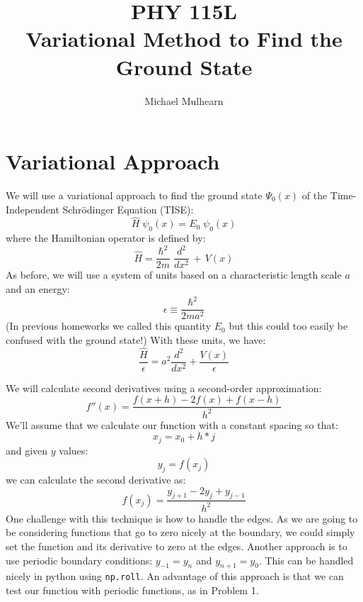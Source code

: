 \documentclass[12pt]{book}
\begin{document}
\newcommand{\ihbar}{\ensuremath{i \hbar}}
\newcommand{\Pss}{\ensuremath{\Psi^*}}
\newcommand{\dPsidt}{\ensuremath{ \frac{\partial \Psi}{\partial t} }}
\newcommand{\dPsidx}{\ensuremath{ \frac{\partial \Psi}{\partial x} }}
\newcommand{\ddPsidx}{\ensuremath{ \frac{\partial^2 \Psi}{\partial x^2} }}
\newcommand{\dPssdt}{\ensuremath{ \frac{\partial \Psi^*}{\partial t} }}
\newcommand{\dPssdx}{\ensuremath{ \frac{\partial \Psi^*}{\partial x} }}
\newcommand{\ddPssdx}{\ensuremath{ \frac{\partial^2 \Psi^*}{\partial x^2} }}

\newcommand{\dphidt}{\ensuremath{ \frac{d \phi}{dt} }}
\newcommand{\dpsidx}{\ensuremath{ \frac{d \psi}{dx} }}
\newcommand{\ddpsidx}{\ensuremath{ \frac{d^2 \psi}{dx^2} }}


\title{PHY 115L \\ Variational Method to Find the Ground State }
\author{Michael Mulhearn}

\maketitle

\setcounter{chapter}{0}
\chapter{Variational Approach}

We will use a variational approach to find the ground state $\Psi_0(x)$ of the Time-Independent Schr\"odinger Equation (TISE):
$$\hat{H} \; \psi_0(x) = E_0 \; \psi_0(x)$$
where the Hamiltonian operator is defined by:
\begin{equation}
\hat{H} = \frac{\hbar^2}{2 m} \; \frac{d^2}{dx^2} \, + \, V(x)
\end{equation}
As before, we will use a system of units based on a characteristic length scale $a$ and an energy:
\begin{equation}
\epsilon \equiv \frac{\hbar^2}{2ma^2}
\end{equation}
(In previous homeworks we called this quantity $E_0$ but this could too easily be confused with the ground state!)  With these units, we have:
\begin{equation}
\frac{\hat{H}}{\epsilon} = a^2\frac{d^2}{dx^2} + \frac{V(x)}{\epsilon}
\end{equation}

We will calculate second derivatives using a second-order approximation:
$$f''(x) = \frac{f(x+h)-2f(x)+f(x-h)}{h^2}$$
We'll assume that we calculate our function with a constant spacing so that:
$$x_j = x_0 + h * j$$
and given $y$ values:
$$y_j = f(x_j)$$
we can calculate the second derivative as:
$$f(x_j) = \frac{y_{j + 1} - 2 y_j + y_{j-1}}{h^2}$$
One challenge with this technique is how to handle the edges.  As we are going to be considering functions that go to zero nicely at the boundary, we could simply set the function and its derivative to zero at the edges.  Another approach is to use periodic boundary conditions:  $y_{-1} = y_{n}$ and $y_{n+1}=y_{0}$.  This can be handled nicely in python using {\tt np.roll}.  An advantage of this approach is that we can test our function with periodic functions, as in Problem 1.
\end{document}
